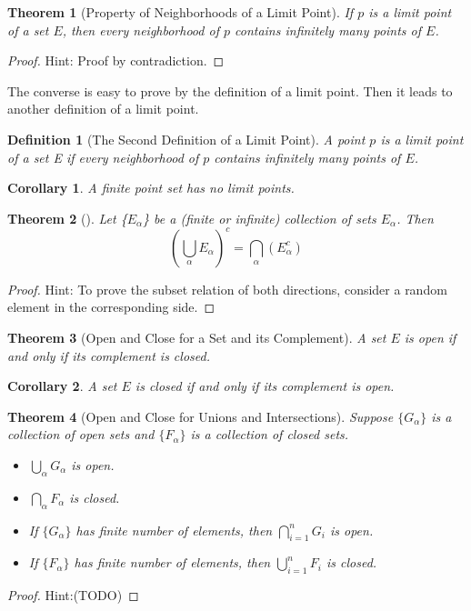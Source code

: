 \documentclass[onecolumn]{ctexart}
\theoremstyle{break}
\newtheorem{definition}{Definition}
\newtheorem{theorem}{Theorem}
\newtheorem{corollary}{Corollary}
\begin{document}
\begin{theorem}[Property of Neighborhoods of a Limit Point]
  If $p$ is a limit point of a set $E$, then every neighborhood of $p$ contains 
  infinitely many points of $E$.
\end{theorem}
\begin{proof}
  Hint: Proof by contradiction.
\end{proof}
The converse is easy to prove by the definition of a limit point. Then it leads 
to another definition of a limit point.
\begin{definition}[The Second Definition of a Limit Point]
  A point $p$ is a limit point of a set E if every neighborhood of $p$ contains 
  infinitely many points of $E$.
\end{definition}
\begin{corollary}
  A finite point set has no limit points.
\end{corollary}

\begin{theorem}[]
  Let \{$E_\alpha$\} be a (finite or infinite) collection of sets $E_\alpha$. Then
  \begin{equation}
    (\bigcup_\alpha E_\alpha)^c = \bigcap_\alpha (E_\alpha^c)
  \end{equation}
\end{theorem}
\begin{proof}
  Hint: To prove the subset relation of both directions, consider a random 
  element in the corresponding side.
\end{proof}

\begin{theorem}[Open and Close for a Set and its Complement]
  A set $E$ is open if and only if its complement is closed.
\end{theorem}
\begin{corollary}
  A set $E$ is closed if and only if its complement is open.
\end{corollary}

\begin{theorem}[Open and Close for Unions and Intersections]
  Suppose $\{G_\alpha\}$ is a collection of open sets and $\{F_\alpha\}$ is a 
  collection of closed sets.
  \begin{itemize}
    \item $\bigcup_\alpha G_\alpha$ is open.
    \item $\bigcap_\alpha F_\alpha$ is closed.
    \item If $\{G_\alpha\}$ has finite number of elements, then 
    $\bigcap_{i=1}^n G_i$ is open.
    \item If $\{F_\alpha\}$ has finite number of elements, then 
    $\bigcup_{i=1}^n F_i$ is closed.
  \end{itemize}
\end{theorem}
\begin{proof}
  Hint:(TODO)
\end{proof}
\end{document}
